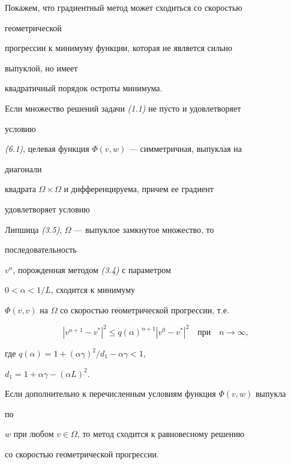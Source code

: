 Покажем, что градиентный метод может сходиться со скоростью


геометрической


прогрессии к минимуму функции, которая не является сильно


выпуклой, но имеет


квадратичный порядок остроты минимума.





\begin{thm}


Если множество решений задачи {\em (1.1)} не пусто и удовлетворяет


условию


{\em (6.1)}, целевая функция $\Phi(v,w)$ --- симметричная, выпуклая на


диагонали


квадрата $\Omega\times\Omega$ и дифференцируема, причем ее градиент


удовлетворяет условию


Липшица {\em (3.5)}, $\Omega$ --- выпуклое замкнутое множество, то


последовательность


$v^n$, порожденная методом {\em (3.4)} с параметром


$0<\alpha<1/L$, сходится к минимуму


$\Phi(v,v)$ на $\Omega$ со скоростью геометрической прогрессии, т.е.


$$


|v^{n+1}-v^*|^2\le q(\alpha)^{n+1}|v^0-v^*|^2\quad


\text{при}\quad n\to\infty,


$$


где $q(\alpha)=1+(\alpha\gamma)^2/d_1-\alpha\gamma<1$,


$d_1=1+\alpha\gamma-(\alpha L)^2$.





Если дополнительно к перечисленным условиям функция $\Phi(v,w)$ выпукла


по


$w$ при любом $v\in \Omega$, то метод сходится к равновесному решению


со скоростью геометрической прогрессии.


\end{thm}





